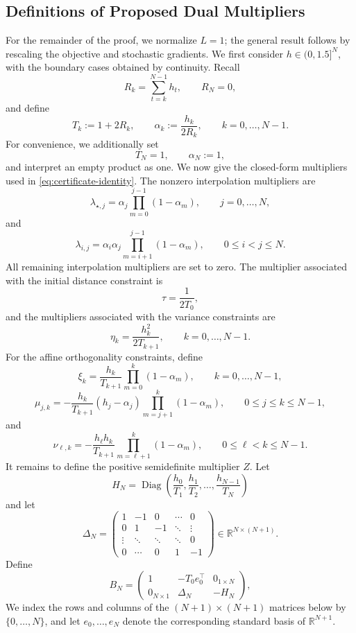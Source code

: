 \documentclass[11pt, hidelinks]{article}
\begin{document}
\subsection{Definitions of Proposed Dual Multipliers}\label{subsec:multipliers}
For the remainder of the proof, we normalize $L=1$; the general result follows by rescaling the objective and stochastic gradients. We first consider $h\in(0,1.5]^N$, with the boundary cases obtained by continuity.
Recall\[R_k=\sum_{t=k}^{N-1}h_t,\qquad R_N=0,\] and define
\[ T_k:=1+2R_k, \qquad \alpha_k:=\frac{h_k}{2R_k}, \qquad k=0,\ldots,N-1. \]
For convenience, we additionally set
\[ T_N=1, \qquad \alpha_N:=1, \]
and interpret an empty product as one.
We now give the closed-form multipliers used in
\eqref{eq:certificate-identity}. The nonzero interpolation multipliers
are \[ \lambda_{\star,j} = \alpha_j \prod_{m=0}^{j-1}(1-\alpha_m), \qquad
j=0,\ldots,N, \]
and \[ \lambda_{i,j} = \alpha_i\alpha_j \prod_{m=i+1}^{j-1}(1-\alpha_m),
\qquad 0\leq i<j\leq N. \]
All remaining interpolation multipliers are set to zero.
The multiplier associated with the initial distance constraint is
\[ \tau=\frac{1}{2T_0}, \]
and the multipliers associated with the variance constraints are
\[ \eta_k=\frac{h_k^2}{2T_{k+1}}, \qquad k=0,\ldots,N-1. \]
For the affine orthogonality constraints, define
\[ \xi_k = \frac{h_k}{T_{k+1}} \prod_{m=0}^{k}(1-\alpha_m),
\qquad k=0,\ldots,N-1, \]
\[ \mu_{j,k} = - \frac{h_k}{T_{k+1}} (h_j-\alpha_j) \prod_{m=j+1}^{k}(1-\alpha_m), \qquad 0\leq j\leq k\leq N-1, \]
and \[ \nu_{\ell,k} = - \frac{h_\ell h_k}{T_{k+1}} \prod_{m=\ell+1}^{k}(1-\alpha_m), \qquad 0\leq\ell<k\leq N-1. \]
It remains to define the positive semidefinite multiplier $Z$. Let
\[H_N = \operatorname{Diag} \left( \frac{h_0}{T_1}, \frac{h_1}{T_2},
\ldots, \frac{h_{N-1}}{T_N} \right) \]
and let \[ \Delta_N =
\begin{pmatrix}
1&-1&0&\cdots&0\\
0&1&-1&\ddots&\vdots\\
\vdots&\ddots&\ddots&\ddots&0\\
0&\cdots&0&1&-1
\end{pmatrix}
\in\mathbb R^{N\times(N+1)}. \]
Define \[ B_N =
\begin{pmatrix}
1 & -T_0 e_0^\top & 0_{1\times N}\\
0_{N\times1} & \Delta_N & -H_N
\end{pmatrix}, \]
We index the rows and columns of the $(N+1)\times(N+1)$ matrices
below by $\{0,\ldots,N\}$, and let $e_0,\ldots,e_N$ denote the
corresponding standard basis of $\mathbb R^{N+1}$.
\end{document}
